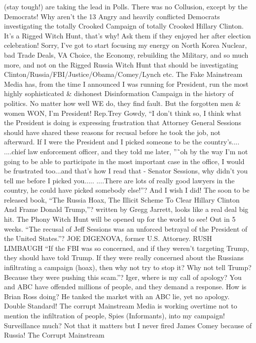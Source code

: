 (stay tough!) are taking the lead in Polls. There was no Collusion,
except by the Democrats! Why aren't the 13 Angry and heavily conflicted
Democrats investigating the totally Crooked Campaign of totally Crooked
Hillary Clinton. It's a Rigged Witch Hunt, that's why! Ask them if they
enjoyed her after election celebration! Sorry, I've got to start
focusing my energy on North Korea Nuclear, bad Trade Deals, VA Choice,
the Economy, rebuilding the Military, and so much more, and not on the
Rigged Russia Witch Hunt that should be investigating
Clinton/Russia/FBI/Justice/Obama/Comey/Lynch etc. The Fake Mainstream
Media has, from the time I announced I was running for President, run
the most highly sophisticated \& dishonest Disinformation Campaign in
the history of politics. No matter how well WE do, they find fault. But
the forgotten men \& women WON, I'm President! Rep.Trey Gowdy, ``I don't
think so, I think what the President is doing is expressing frustration
that Attorney General Sessions should have shared these reasons for
recusal before he took the job, not afterward. If I were the President
and I picked someone to be the country's.... ....chief law enforcement
officer, and they told me later, ''˜oh by the way I'm not going to be
able to participate in the most important case in the office, I would be
frustrated too...and that's how I read that - Senator Sessions, why
didn't you tell me before I picked you..... ....There are lots of really
good lawyers in the country, he could have picked somebody else!''? And
I wish I did! The soon to be released book, ``The Russia Hoax, The
Illicit Scheme To Clear Hillary Clinton And Frame Donald Trump,''?
written by Gregg Jarrett, looks like a real deal big hit. The Phony
Witch Hunt will be opened up for the world to see! Out in 5 weeks. ``The
recusal of Jeff Sessions was an unforced betrayal of the President of
the United States.''? JOE DIGENOVA, former U.S. Attorney. RUSH LIMBAUGH
``If the FBI was so concerned, and if they weren't targeting Trump, they
should have told Trump. If they were really concerned about the Russians
infiltrating a campaign (hoax), then why not try to stop it? Why not
tell Trump? Because they were pushing this scam.''? Iger, where is my
call of apology? You and ABC have offended millions of people, and they
demand a response. How is Brian Ross doing? He tanked the market with an
ABC lie, yet no apology. Double Standard! The corrupt Mainstream Media
is working overtime not to mention the infiltration of people, Spies
(Informants), into my campaign! Surveillance much? Not that it matters
but I never fired James Comey because of Russia! The Corrupt Mainstream
